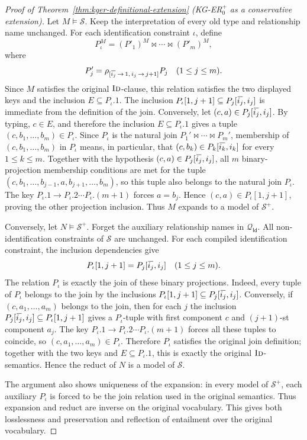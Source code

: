 \documentclass[10pt]{article}
\newcommand{\ols}[1]{\mskip.5\thinmuskip\overline{\mskip-.5\thinmuskip {#1} \mskip-.5\thinmuskip}\mskip.5\thinmuskip} %
\begin{document}
\begin{proof}[Proof of Theorem~\ref{thm:kger-definitional-extension} (KG-ER\(_0^+\) as a conservative extension)]
Let \(M\models\mathcal S\).  Keep the interpretation of every old type
and relationship name unchanged.  For each identification constraint
\(\iota\), define
\[
P_\iota^M=(P'_1)^M\bowtie\cdots\bowtie(P'_m)^M,
\]
where
\[
P'_{j}=\rho_{[\ols{i_j}\,\rightarrow\,1,\,
                 i_j\,\rightarrow\,j+1]}P_j
\quad (1\leq j\leq m).
\]
Since \(M\) satisfies the original \(\textsc{Id}\)-clause, this relation
satisfies the two displayed keys and the inclusion
\(E\subseteq P_\iota.1\).  The inclusion
\(P_\iota[1,j+1]\subseteq P_j[\ols{i_j},i_j]\) is immediate from the
definition of the join.  Conversely, let
\((c,a)\in P_j[\ols{i_j},i_j]\).  By typing, \(c\in E\), and therefore
the inclusion \(E\subseteq P_\iota.1\) gives a tuple
\((c,b_1,\ldots,b_m)\in P_\iota\).  Since \(P_\iota\) is the natural
join \(P_1'\bowtie\cdots\bowtie P_m'\), membership of
\((c,b_1,\ldots,b_m)\) in \(P_\iota\) means, in particular, that
\((c,b_k)\in P_k[\ols{i_k},i_k]\) for every \(1\leq k\leq m\).
Together with the hypothesis \((c,a)\in P_j[\ols{i_j},i_j]\), all
\(m\) binary-projection membership conditions are met for the tuple
\((c,b_1,\ldots,b_{j-1},a,b_{j+1},\ldots,b_m)\), so this tuple also
belongs to the natural join \(P_\iota\).  The key
\(P_\iota.1\to P_\iota.2\cdots P_\iota.(m+1)\) forces \(a=b_j\).  Hence
\((c,a)\in P_\iota[1,j+1]\), proving the other projection inclusion.
Thus \(M\) expands to a model of \(\mathcal S^+\).

Conversely, let \(N\models\mathcal S^+\).  Forget the auxiliary
relationship names in \(\mathcal Q_{\mathsf{Id}}\).  All
non-identification constraints of \(\mathcal S\) are unchanged.  For each
compiled identification constraint, the inclusion dependencies give
\[
P_\iota[1,j+1]=P_j[\ols{i_j},i_j]\quad (1\leq j\leq m).
\]
The relation \(P_\iota\) is exactly the join of these binary projections.
Indeed, every tuple of \(P_\iota\) belongs to the join by the inclusions
\(P_\iota[1,j+1]\subseteq P_j[\ols{i_j},i_j]\).  Conversely, if
\((c,a_1,\ldots,a_m)\) belongs to the join, then for each \(j\) the
inclusion \(P_j[\ols{i_j},i_j]\subseteq P_\iota[1,j+1]\) gives a
\(P_\iota\)-tuple with first component \(c\) and \((j+1)\)-st component
\(a_j\).  The key
\(P_\iota.1\to P_\iota.2\cdots P_\iota.(m+1)\) forces all these tuples to
coincide, so \((c,a_1,\ldots,a_m)\in P_\iota\).  Therefore \(P_\iota\)
satisfies the original join definition; together with the two keys and
\(E\subseteq P_\iota.1\), this is exactly the original
\(\textsc{Id}\)-semantics.  Hence the reduct of \(N\) is a model of
\(\mathcal S\).

The argument also shows uniqueness of the expansion: in every model of
\(\mathcal S^+\), each auxiliary \(P_\iota\) is forced to be the join
relation used in the original semantics.  Thus expansion and reduct are
inverse on the original vocabulary.  This gives both losslessness and
preservation and reflection of entailment over the original vocabulary.
\end{proof}
\end{document}
